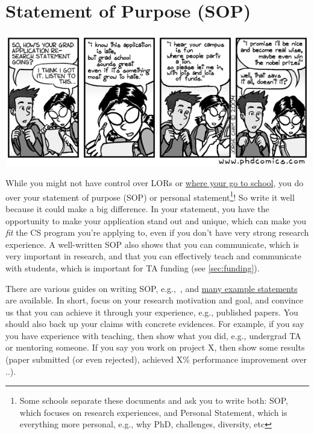 \documentclass[oneside,11pt]{memoir}
\begin{document}
\section{Statement of Purpose (SOP)}\label{sec:research-statement}

\begin{center}
  \includegraphics[scale=0.4]{files/c2.png}
\end{center}

While you might not have control over LORs or \hyperref[sec:your-school]{where your go to school}, you do over your
statement of purpose (SOP) or personal statement\footnote{Some schools separate these documents and ask you to write both: SOP, which focuses on research experiences, and Personal Statement, which is everything more personal, e.g., why PhD, challenges, diversity, etc}! So write it well because it could make a big difference.
In your statement, you have the opportunity to make your application stand out and unique, which can make you \emph{fit} the CS program you're applying to, even if you don't have very strong research experience.
A well-written SOP also shows that you can communicate, which is very important in research, and that you can effectively teach and communicate with students, which is important for TA funding (see \autoref{sec:funding}).

There are various guides on writing SOP, e.g.,~\cite{blattman2022writing}, and \href{https://cs-sop.org/}{many example statements} are available. In short, focus on your research motivation and goal, and convince us that you can achieve it through your experience, e.g., published papers. You should also back up your claims with concrete evidences. For example, if you say you have experience with teaching, then show what you did, e.g., undergrad TA or mentoring someone.  If you say you work on project X, then show some results (paper submitted (or even rejected), achieved X\% performance improvement over ..). 
\end{document}
